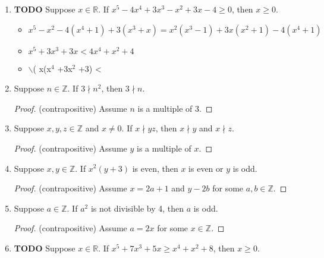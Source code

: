 \documentclass[11pt, oneside]{amsart}
\begin{document}
\begin{enumerate}
\label{sec:org7f72778}
\begin{proof} (contrapositive) Assume $a$ is odd. \end{proof}
\item {\bfseries\sffamily TODO} Suppose \(x \in \mathbb{R}\).  If \(x^5-4x^4+3x^3-x^2+3x-4 \geq 0\), then \(x \geq 0\).
\label{sec:org09c74fe}
\begin{itemize}
\item \(x^5-x^2 -4(x^4+1) + 3(x^3+x) = x^2(x^3-1) + 3x(x^2+1) -4(x^4+1)\)
\item \(x^5 +3x^3 +3x < 4x^4 +x^2 + 4\)
\item $\backslash$( x(x\(^{\text{4}}\) +3x\(^{\text{2}}\) +3) <
\end{itemize}
\item Suppose \(n \in \mathbb{Z}\).  If \(3 \!\nmid\! n^2\), then \(3 \!\nmid\! n\).
\label{sec:orgb2706ee}
\begin{proof} (contrapositive) Assume $n$ is a multiple of 3. \end{proof}
\item Suppose \(x, y, z \in \mathbb{Z}\) and \(x \neq 0\).  If \(x \!\nmid\! yz\), then \(x \!\nmid\! y\) and \(x \!\nmid\! z\).
\label{sec:org9a84801}
\begin{proof} (contrapositive) Assume $y$ is a multiple of $x$. \end{proof}
\item Suppose \(x, y \in \mathbb{Z}\).  If \(x^2(y+3)\) is even, then \(x\) is even or \(y\) is odd.
\label{sec:orgeca5c18}
\begin{proof} (contrapositive) Assume $x=2a+1$ and $y-2b$ for some $a,b \in \mathbb{Z}$. \end{proof}
\item Suppose \(a \in \mathbb{Z}\).  If \(a^2\) is not divisible by 4, then \(a\) is odd.
\label{sec:org6d282fd}
\begin{proof} (contrapositive) Assume $a=2x$ for some $x \in \mathbb{Z}$. \end{proof}
\item {\bfseries\sffamily TODO} Suppose \(x \in \mathbb{R}\).  If \(x^5 + 7x^3 + 5x \geq x^4 + x^2 + 8\), then \(x \geq 0\).
\label{sec:orgd6b51f5}
\end{enumerate}
\end{document}
